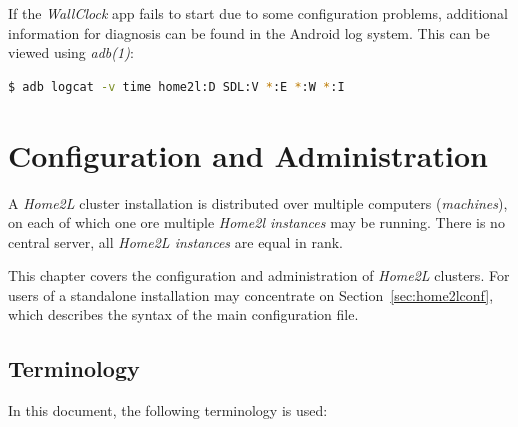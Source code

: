 \documentclass[12pt,english,parskip=half,headheight=19pt]{scrreprt}
\begin{document}
If the \textit{WallClock} app fails to start due to some configuration problems,
additional information for diagnosis can be found in the Android log system.
This can be viewed using \textit{adb(1)}:
\begin{lstlisting}[language=bash]
  $ adb logcat -v time home2l:D SDL:V *:E *:W *:I
\end{lstlisting}






\chapter{Configuration and Administration}
\label{ch:managing}


A \textit{Home2L} cluster installation is distributed over multiple computers (\textit{machines}), on each of which one ore multiple \textit{Home2l instances} may be running. There is no central server, all \textit{Home2L instances} are equal in rank.

This chapter covers the configuration and administration of \textit{Home2L} clusters. For users of a standalone installation may concentrate on Section~\ref{sec:home2lconf}, which describes the syntax of the main configuration file.



\section{Terminology}
\label{sec:managing-terminology}


In this document, the following terminology is used:
\end{document}
